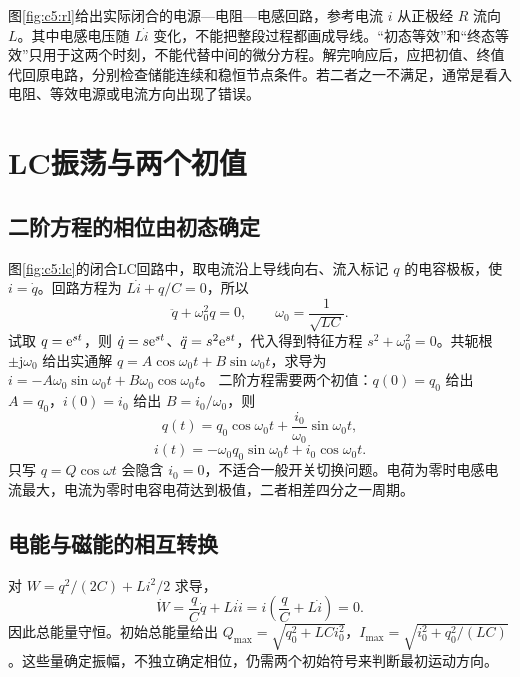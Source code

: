 图\ref{fig:c5:rl}给出实际闭合的电源—电阻—电感回路，参考电流 $i$ 从正极经 $R$ 流向 $L$。其中电感电压随 $L\dot i$ 变化，不能把整段过程都画成导线。“初态等效”和“终态等效”只用于这两个时刻，不能代替中间的微分方程。解完响应后，应把初值、终值代回原电路，分别检查储能连续和稳恒节点条件。若二者之一不满足，通常是看入电阻、等效电源或电流方向出现了错误。


\section{LC振荡与两个初值}
\subsection{二阶方程的相位由初态确定}

图\ref{fig:c5:lc}的闭合LC回路中，取电流沿上导线向右、流入标记 $q$ 的电容极板，使 $i=\dot q$。回路方程为 $L\dot i+q/C=0$，所以
\[
 \ddot q+\omega_0^2q=0,\qquad\omega_0=\frac1{\sqrt{LC}}.
\]
试取 $q=\mathrm e^{st}$，则 $\dot q=s\mathrm e^{st}$、$\ddot q=s^2\mathrm e^{st}$，代入得到特征方程 $s^2+\omega_0^2=0$。共轭根 $\pm\mathrm j\omega_0$ 给出实通解
$q=A\cos\omega_0t+B\sin\omega_0t$，求导为
$i=-A\omega_0\sin\omega_0t+B\omega_0\cos\omega_0t$。
二阶方程需要两个初值：$q(0)=q_0$ 给出 $A=q_0$，$i(0)=i_0$ 给出 $B=i_0/\omega_0$，则
\[
 q(t)=q_0\cos\omega_0t+\frac{i_0}{\omega_0}\sin\omega_0t,
\]
\[
 i(t)=-\omega_0q_0\sin\omega_0t+i_0\cos\omega_0t.
\]
只写 $q=Q\cos\omega t$ 会隐含 $i_0=0$，不适合一般开关切换问题。电荷为零时电感电流最大，电流为零时电容电荷达到极值，二者相差四分之一周期。

\subsection{电能与磁能的相互转换}

对 $W=q^2/(2C)+Li^2/2$ 求导，
\[
 \dot W=\frac qC\dot q+Li\dot i=i\left(\frac qC+L\dot i\right)=0.
\]
因此总能量守恒。初始总能量给出 $Q_{\max}=\sqrt{q_0^2+LCi_0^2}$，$I_{\max}=\sqrt{i_0^2+q_0^2/(LC)}$。这些量确定振幅，不独立确定相位，仍需两个初始符号来判断最初运动方向。

